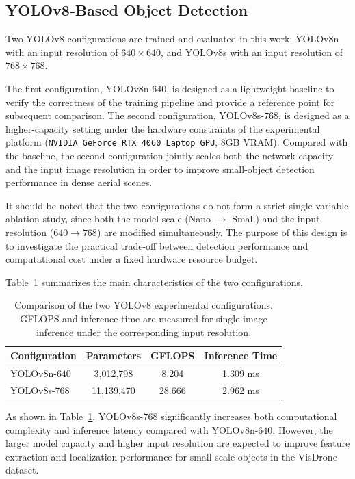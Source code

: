 \subsection{YOLOv8-Based Object Detection}

Two YOLOv8 configurations are trained and evaluated in this work: YOLOv8n with an input resolution of $640 \times 640$, and YOLOv8s with an input resolution of $768 \times 768$.

The first configuration, YOLOv8n-$640$, is designed as a lightweight baseline to verify the correctness of the training pipeline and provide a reference point for subsequent comparison. The second configuration, YOLOv8s-$768$, is designed as a higher-capacity setting under the hardware constraints of the experimental platform (\texttt{NVIDIA GeForce RTX 4060 Laptop GPU}, 8GB VRAM). Compared with the baseline, the second configuration jointly scales both the network capacity and the input image resolution in order to improve small-object detection performance in dense aerial scenes.

It should be noted that the two configurations do not form a strict single-variable ablation study, since both the model scale (Nano $\rightarrow$ Small) and the input resolution ($640 \rightarrow 768$) are modified simultaneously. The purpose of this design is to investigate the practical trade-off between detection performance and computational cost under a fixed hardware resource budget.

Table~\ref{tab:yolov8_configs} summarizes the main characteristics of the two configurations.

\begin{table}[htbp]
    \centering
    \caption{Comparison of the two YOLOv8 experimental configurations. GFLOPS and inference time are measured for single-image inference under the corresponding input resolution.}
    \label{tab:yolov8_configs}
    \begin{tabular}{lccc}
        \toprule
        Configuration & Parameters & GFLOPS & Inference Time \\
        \midrule
        YOLOv8n-$640$ & 3,012,798 & 8.204 & 1.309 ms \\
        YOLOv8s-$768$ & 11,139,470 & 28.666 & 2.962 ms \\
        \bottomrule
    \end{tabular}
\end{table}

As shown in Table~\ref{tab:yolov8_configs}, YOLOv8s-$768$ significantly increases both computational complexity and inference latency compared with YOLOv8n-$640$. However, the larger model capacity and higher input resolution are expected to improve feature extraction and localization performance for small-scale objects in the VisDrone dataset.
